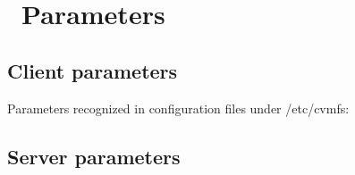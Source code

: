 \chapter{\cvmfs\ Parameters}
\label{apx:parameters}

\section{Client parameters}
Parameters recognized in configuration files under /etc/cvmfs:


\pagebreak

\section{Server parameters}
